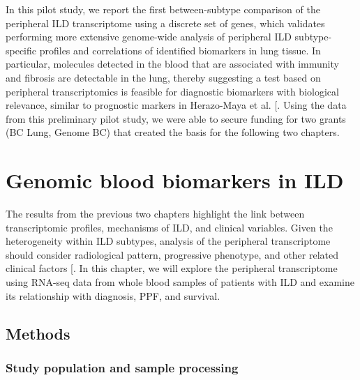 \documentclass[
]{article}
\begin{document}
In this pilot study, we report the first between-subtype comparison of the peripheral ILD transcriptome using a discrete set of genes, which validates performing more extensive genome-wide analysis of peripheral ILD subtype-specific profiles and correlations of identified biomarkers in lung tissue. In particular, molecules detected in the blood that are associated with immunity and fibrosis are detectable in the lung, thereby suggesting a test based on peripheral transcriptomics is feasible for diagnostic biomarkers with biological relevance, similar to prognostic markers in Herazo-Maya et al. {[}\citeproc{ref-herazo-maya_validating_2017}{100}{]}. Using the data from this preliminary pilot study, we were able to secure funding for two grants (BC Lung, Genome BC) that created the basis for the following two chapters.

\clearpage

\section{Genomic blood biomarkers in ILD}\label{genomic-blood-biomarkers-in-ild}

\renewcommand{\thefigure}{4.\arabic{figure}}
\setcounter{figure}{0}
\renewcommand{\thetable}{4.\arabic{table}}
\setcounter{table}{0}
\renewcommand{\theequation}{4.\arabic{equation}}
\setcounter{equation}{0}

The results from the previous two chapters highlight the link between transcriptomic profiles, mechanisms of ILD, and clinical variables. Given the heterogeneity within ILD subtypes, analysis of the peripheral transcriptome should consider radiological pattern, progressive phenotype, and other related clinical factors {[}\citeproc{ref-ryerson_lumpers_2019}{120}{]}. In this chapter, we will explore the peripheral transcriptome using RNA-seq data from whole blood samples of patients with ILD and examine its relationship with diagnosis, PPF, and survival.

\subsection{Methods}\label{methods-2}

\subsubsection{Study population and sample processing}\label{study-population-and-sample-processing-1}
\end{document}
